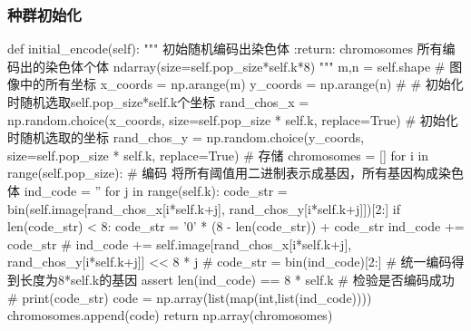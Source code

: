 \documentclass{article}
\begin{document}
\subsubsection{种群初始化}
\begin{python}
    def initial_encode(self):
        """
        初始随机编码出染色体
        :return: chromosomes 所有编码出的染色体个体 ndarray(size=self.pop_size*self.k*8)
        """
        m,n = self.shape
        # 图像中的所有坐标
        x_coords = np.arange(m)
        y_coords = np.arange(n)
        # # 初始化时随机选取self.pop_size*self.k个坐标
        rand_chos_x = np.random.choice(x_coords, size=self.pop_size * self.k, replace=True)  # 初始化时随机选取的坐标
        rand_chos_y = np.random.choice(y_coords, size=self.pop_size * self.k, replace=True)
        # 存储
        chromosomes = []
        for i in range(self.pop_size):
            # 编码 将所有阈值用二进制表示成基因，所有基因构成染色体
            ind_code = ''
            for j in range(self.k):
                code_str = bin(self.image[rand_chos_x[i*self.k+j], rand_chos_y[i*self.k+j]])[2:]
                if len(code_str) < 8:
                    code_str = '0' * (8 - len(code_str)) + code_str
                ind_code += code_str
                # ind_code += self.image[rand_chos_x[i*self.k+j], rand_chos_y[i*self.k+j]] << 8 * j
            # code_str = bin(ind_code)[2:]
            # 统一编码得到长度为8*self.k的基因
            assert len(ind_code) == 8 * self.k  # 检验是否编码成功
            # print(code_str)
            code = np.array(list(map(int,list(ind_code))))
            chromosomes.append(code)
        return np.array(chromosomes)
\end{python}
\end{document}
